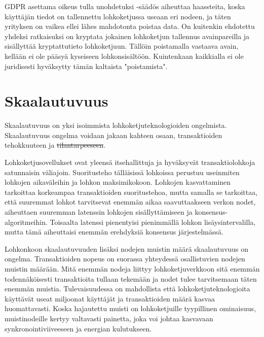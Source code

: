 \documentclass[utf8,bachelor]{gradu3}
\providecommand{\DIFaddtex}[1]{{\protect\color{blue}\uwave{#1}}} %
\providecommand{\DIFdeltex}[1]{{\protect\color{red}\sout{#1}}}                      %
\providecommand{\DIFaddbegin}{} %
\providecommand{\DIFaddend}{} %
\providecommand{\DIFdelbegin}{} %
\providecommand{\DIFdelend}{} %
\providecommand{\DIFadd}[1]{\texorpdfstring{\DIFaddtex{#1}}{#1}} %
\providecommand{\DIFdel}[1]{\texorpdfstring{\DIFdeltex{#1}}{}} %
\newcommand{\DIFscaledelfig}{0.5}
\newlength{\DIFdelgraphicswidth} %
\newlength{\DIFdelgraphicsheight} %
\newcommand{\DIFaddincludegraphics}[2][]{{\color{blue}\fbox{\DIFOincludegraphics[#1]{#2}}}} %
\newcommand{\DIFdelincludegraphics}[2][]{%
\sbox{\DIFdelgraphicsbox}{\DIFOincludegraphics[#1]{#2}}%
\settoboxwidth{\DIFdelgraphicswidth}{\DIFdelgraphicsbox} %
\settoboxtotalheight{\DIFdelgraphicsheight}{\DIFdelgraphicsbox} %
\scalebox{\DIFscaledelfig}{%
\parbox[b]{\DIFdelgraphicswidth}{\usebox{\DIFdelgraphicsbox}\\[-\baselineskip] \rule{\DIFdelgraphicswidth}{0em}}\llap{\resizebox{\DIFdelgraphicswidth}{\DIFdelgraphicsheight}{%
\setlength{\unitlength}{\DIFdelgraphicswidth}%
\begin{picture}(1,1)%
\thicklines\linethickness{2pt} %
{\color[rgb]{1,0,0}\put(0,0){\framebox(1,1){}}}%
{\color[rgb]{1,0,0}\put(0,0){\line( 1,1){1}}}%
{\color[rgb]{1,0,0}\put(0,1){\line(1,-1){1}}}%
\end{picture}%
}\hspace*{3pt}}} %
} %
\DeclareRobustCommand{\DIFaddbegin}{\DIFOaddbegin \let\includegraphics\DIFaddincludegraphics} %
\DeclareRobustCommand{\DIFaddend}{\DIFOaddend \let\includegraphics\DIFOincludegraphics} %
\DeclareRobustCommand{\DIFdelbegin}{\DIFOdelbegin \let\includegraphics\DIFdelincludegraphics} %
\DeclareRobustCommand{\DIFdelend}{\DIFOaddend \let\includegraphics\DIFOincludegraphics} %
\begin{document}
GDPR asettama oikeus tulla unohdetuksi -säädös aiheuttaa haassteita, koska käyttäjän tiedot on tallennettu lohkoketjussa useaan eri nodeen, ja täten yrityksen on vaikea ellei lähes mahdotonta poistaa data. On kuitenkin ehdotettu yhdeksi ratkaisuksi on kryptata jokainen lohkoketjun tallennus avainpareilla ja sisällyttää kryptattutieto lohkoketjuun. Tällöin poistamalla vastaava avain, kellään ei ole pääsyä kyseiseen lohkonsisältöön. Kuintenkaan kaikkialla ei ole juridisesti hyväksytty tämän kaltaista "poistamista". \parencite{ali2019blockchain}

\section{Skaalautuvuus}
Skaalautuvuus on yksi isoimmista lohkoketjuteknologioiden ongelmista. Skaalautuvuus ongelma voidaan jakaan kahteen osaan, transaktioiden tehokkuuteen ja \DIFdelbegin \DIFdel{tilantarpeeseen}\DIFdelend \DIFaddbegin \DIFadd{muistin tarpeeseen}\DIFaddend .

Lohkoketjusovellukset ovat yleensä itsehallittuja ja hyväksyvät transaktiolohkoja satunnaisin väliajoin.
Suoritusteho tälläisissä lohkoissa perustuu useinmiten lohkojen aikaväleihin ja lohkon maksimikokoon.
Lohkojen kasvattaminen tarkoittaa korkeampaa transaktioiden suoritustehoa, mutta samalla se tarkoittaa, että suuremmat lohkot tarvitsevat enemmän aikaa saavuttaakseen verkon nodet, aiheuttaen suuremman latenssin lohkojen sisällyttämiseen ja konsensus-algoritmeihin.
Toisaalta latenssi pienentyisi pienimmällä lohkon lisäysintervalilla, mutta tämä aiheuttaisi  enemmän erehdyksiä konsensus järjestelmässä.

Lohkonkoon skaalautuvuuden lisäksi nodejen muistin määrä skaalautuvuus on ongelma. Transaktioiden nopeus on suorassa yhteydessä osallistuvien nodejen muistin määrään.
Mitä enemmän nodeja liittyy lohkoketjuverkkoon sitä enemmän todennäköisesti transaktioita tullaan tekemään ja nodet tulee tarvitsemaan täten enemmän muistia.
Tulevaisuudessa on mahdollista että lohkoketjuteknologioita käyttävät useat miljoonat käyttäjät ja transaktioiden määrä kasvaa huomattavasti.
Koska hajautettu muisti on lohkoketjuille tyypillinen ominaisuus, muistinodeille kertyy valtavasti painetta, joka voi johtaa kasvavaan synkronointiviiveeseen ja energian kulutukseen.

\end{document}
